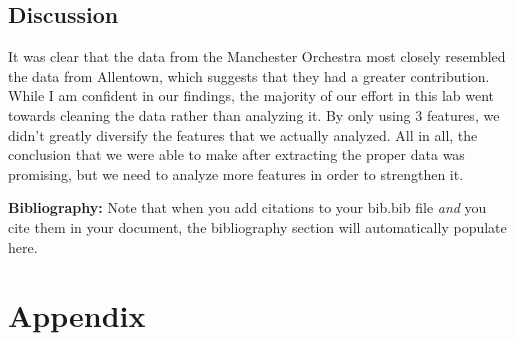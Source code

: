 \documentclass{article}\usepackage[]{graphicx}\usepackage[]{xcolor}
\begin{document}
\begin{multicols}{2}
\section{Discussion}
  It was clear that the data from the Manchester Orchestra most closely resembled the data from 
  Allentown, which suggests that they had a greater contribution. While I am confident in our findings, the majority 
  of our effort in this lab went towards cleaning the data rather than analyzing it. By only using 
  3 features, we didn't greatly diversify the features that we actually analyzed. All in all, the conclusion
  that we were able to make after extracting the proper data was promising, but we need to analyze more features
  in order to strengthen it. 

\vspace{2em}

\noindent\textbf{Bibliography:} Note that when you add citations to your bib.bib file \emph{and}
you cite them in your document, the bibliography section will automatically populate here.

\begin{tiny}

\end{tiny}
\end{multicols}

\newpage
\onecolumn
\section{Appendix}
\end{document}
